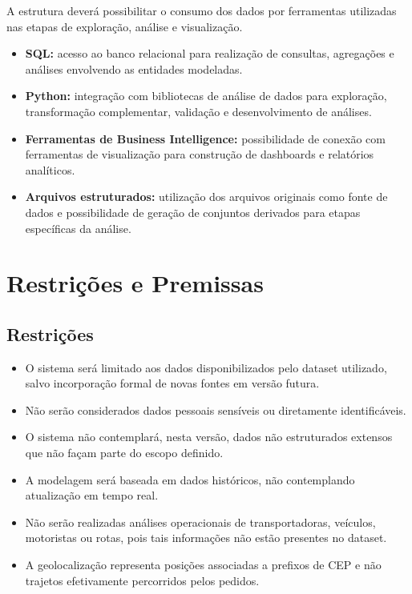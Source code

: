 \documentclass[12pt,a4paper]{article}
\begin{document}
A estrutura deverá possibilitar o consumo dos dados por ferramentas utilizadas nas etapas de exploração, análise e visualização.

\begin{itemize}
    \item \textbf{SQL:} acesso ao banco relacional para realização de consultas, agregações e análises envolvendo as entidades modeladas.

    \item \textbf{Python:} integração com bibliotecas de análise de dados para exploração, transformação complementar, validação e desenvolvimento de análises.

    \item \textbf{Ferramentas de Business Intelligence:} possibilidade de conexão com ferramentas de visualização para construção de dashboards e relatórios analíticos.

    \item \textbf{Arquivos estruturados:} utilização dos arquivos originais como fonte de dados e possibilidade de geração de conjuntos derivados para etapas específicas da análise.
\end{itemize}

\section{Restrições e Premissas}

\subsection{Restrições}

\begin{itemize}
    \item O sistema será limitado aos dados disponibilizados pelo dataset utilizado, salvo incorporação formal de novas fontes em versão futura.

    \item Não serão considerados dados pessoais sensíveis ou diretamente identificáveis.

    \item O sistema não contemplará, nesta versão, dados não estruturados extensos que não façam parte do escopo definido.

    \item A modelagem será baseada em dados históricos, não contemplando atualização em tempo real.

    \item Não serão realizadas análises operacionais de transportadoras, veículos, motoristas ou rotas, pois tais informações não estão presentes no dataset.

    \item A geolocalização representa posições associadas a prefixos de CEP e não trajetos efetivamente percorridos pelos pedidos.
\end{itemize}
\end{document}
